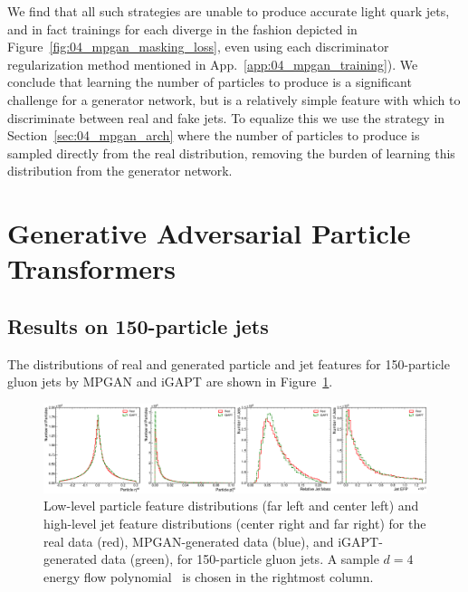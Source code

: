 We find that all such strategies are unable to produce accurate light quark jets, and in fact trainings for each diverge in the fashion depicted in Figure~\ref{fig:04_mpgan_masking_loss}, even using each discriminator regularization method mentioned in App.~\ref{app:04_mpgan_training}).
We conclude that learning the number of particles to produce is a significant challenge for a generator network, but is a relatively simple feature with which to discriminate between real and fake jets.
To equalize this we use the strategy in Section~\ref{sec:04_mpgan_arch} where the number of particles to produce is sampled directly from the real distribution, removing the burden of learning this distribution from the generator network.

\clearpage
\section{Generative Adversarial Particle Transformers}

\subsection{Results on 150-particle jets}
\label{app:04_gapt_150}

The distributions of real and generated particle and jet features for 150-particle gluon jets by MPGAN and iGAPT are shown in Figure~\ref{fig:04_gapt_feature_distributions_150}.

\begin{figure}[ht]
    \centering
    \includegraphics[width=\textwidth]{figures/04-ML4Sim/igapt/feature_distributions_150.pdf}
    \caption[Low-level particle feature distributions and high-level jet feature distributions for 150-particle gluon jets.]{Low-level particle feature distributions (far left and center left) and high-level jet feature distributions (center right and far right) for the real data (red), MPGAN-generated data (blue), and iGAPT-generated data (green), for 150-particle gluon jets.
    A sample $d = 4$ energy flow polynomial~\cite{Komiske:2017aww} is chosen in the rightmost column.
    }
    \label{fig:04_gapt_feature_distributions_150}
\end{figure}


